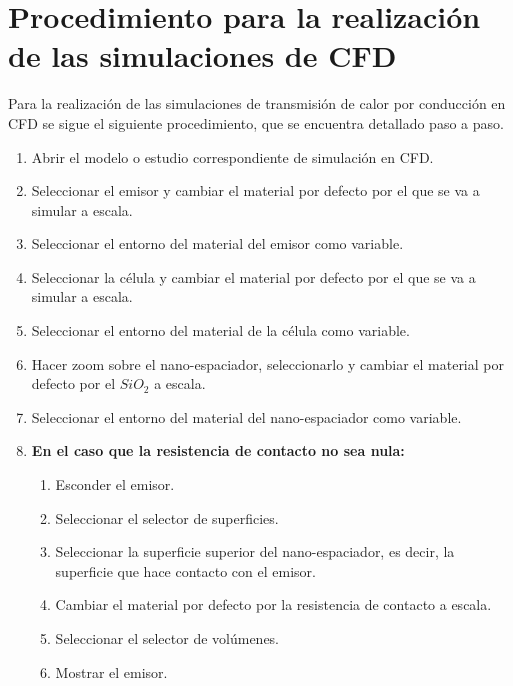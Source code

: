 \chapter[Procedimiento simulación conducci\'{o}n]{Procedimiento para la realización de las simulaciones de CFD}\label{ch:procedimientosSimCond}
Para la realización de las simulaciones de transmisión de calor por conducción en CFD se sigue el siguiente procedimiento, que se encuentra detallado paso a paso.
\begin{enumerate}
	\item Abrir el modelo o estudio correspondiente de simulación en CFD.
	\item Seleccionar el emisor y cambiar el material por defecto por el que se va a simular a escala.
	\item Seleccionar el entorno del material del emisor como variable.
	\item Seleccionar la célula y cambiar el material por defecto por el que se va a simular a escala.
	\item Seleccionar el entorno del material de la célula como variable.
	\item Hacer zoom sobre el nano-espaciador, seleccionarlo y cambiar el material por defecto por el $SiO_2$ a escala.
	\item Seleccionar el entorno del material del nano-espaciador como variable.
	\item \textbf{En el caso que la resistencia de contacto no sea nula:}
	\begin{enumerate}
		\item Esconder el emisor.
		\item Seleccionar el selector de superficies.
		\item Seleccionar la superficie superior del nano-espaciador, es decir, la superficie que hace contacto con el emisor.
		\item Cambiar el material por defecto por la resistencia de contacto a escala.
		\item Seleccionar el selector de volúmenes.
		\item Mostrar el emisor.
	\end{enumerate}
	\begin{figure}[h]

\end{figure}
\end{enumerate}

